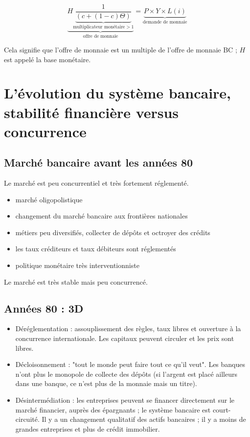 	$$\underbrace{H \underbrace{\frac{1}{(c + ( 1  - c) \Theta)}}_{\text{multiplicateur monétaire} > 1}}_{\text{offre de monnaie}} = \underbrace{P \times  Y \times  L(i)}_{\text{demande de monnaie}}$$
	
	Cela signifie que l'offre de monnaie est un multiple de l'offre de monnaie BC ; $H$ est appelé la base monétaire.
	
\section{L'évolution du système bancaire, stabilité financière versus concurrence}
	
	\subsection{Marché bancaire avant les années 80}

	Le marché est peu concurrentiel et très fortement réglementé.
	
	\begin{itemize}
		\item marché oligopolistique
		\item changement du marché bancaire aux frontières nationales
		\item métiers peu diversifiés, collecter de dépôts et octroyer des crédits
		\item les taux créditeurs et taux débiteurs sont réglementés
		\item politique monétaire très interventionniste
	\end{itemize}
	
	Le marché est très stable mais peu concurrencé.
	
	\subsection{Années 80 : 3D}
	
	\begin{itemize}
		\item Déréglementation : assouplissement des règles, taux libres et ouverture à la concurrence internationale. Les capitaux peuvent circuler et les prix sont libres.
		\item Décloisonnement : "tout le monde peut faire tout ce qu'il veut". Les banques n'ont plus le monopole de collecte des dépôts (si l'argent est placé ailleurs dans une banque, ce n'est plus de la monnaie mais un titre).
		\item Désintermédiation :  les entreprises peuvent se financer directement sur le marché financier, auprès des épargnants ; le système bancaire est court-circuité. Il y a un changement qualitatif des actifs bancaires ; il y a moins de grandes entreprises et plus de crédit immobilier.
	\end{itemize}
	
